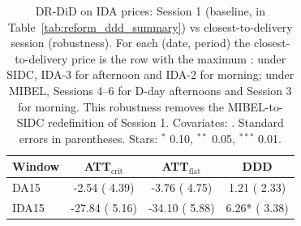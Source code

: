 \begin{table}[H]\centering\footnotesize
\setlength{\tabcolsep}{4pt}
\caption{DR-DiD on IDA prices: Session 1 (baseline, in Table~\ref{tab:reform_ddd_summary}) vs closest-to-delivery session (robustness). For each (date, period) the closest-to-delivery price is the row with the maximum : under SIDC, IDA-3 for afternoon and IDA-2 for morning; under MIBEL, Sessions 4--6 for D-day afternoons and Session 3 for morning. This robustness removes the MIBEL-to-SIDC redefinition of Session 1. Covariates: . Standard errors in parentheses. Stars: $^{*}$ 0.10, $^{**}$ 0.05, $^{***}$ 0.01.}
\label{tab:csdid_ida_latest_compare}
\begin{tabular}{lccc}
\toprule
Window & ATT$_{\text{crit}}$ & ATT$_{\text{flat}}$ & DDD \\
\midrule
DA15 &   -2.54 \scriptsize{( 4.39)} &   -3.76 \scriptsize{( 4.75)} &    1.21 \scriptsize{( 2.33)} \\
IDA15 &  -27.84 \scriptsize{( 5.16)} &  -34.10 \scriptsize{( 5.88)} &    6.26* \scriptsize{( 3.38)} \\
\bottomrule
\end{tabular}
\end{table}
